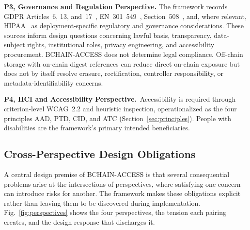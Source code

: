 \documentclass[journal]{IEEEtran}
\begin{document}
\noindent\textbf{P3, Governance and Regulation Perspective.}
The framework records GDPR Articles~6, 13, and~17~\cite{gdpr2016}, EN~301~549~\cite{en301549}, Section~508~\cite{section508}, and, where relevant, HIPAA~\cite{hipaa1996} as deployment-specific regulatory and governance considerations. These sources inform design questions concerning lawful basis, transparency, data-subject rights, institutional roles, privacy engineering, and accessibility procurement. BCHAIN-ACCESS does not determine legal compliance. Off-chain storage with on-chain digest references can reduce direct on-chain exposure but does not by itself resolve erasure, rectification, controller responsibility, or metadata-identifiability concerns.

\noindent\textbf{P4, HCI and Accessibility Perspective.}\ Accessibility is required
through criterion-level WCAG~2.2 and heuristic inspection, operationalized as
the four principles AAD, PTD, CID, and ATC (Section~\ref{sec:principles}). People with
disabilities are the framework's primary intended beneficiaries.

\subsection{Cross-Perspective Design Obligations}

A central design premise of BCHAIN-ACCESS is that several consequential problems arise at the intersections of perspectives, where satisfying one concern can introduce risks for another. The framework makes these obligations explicit rather than leaving them to be discovered during implementation. Fig.~\ref{fig:perspectives} shows the four perspectives, the tension each pairing creates, and the design response that discharges it.
\end{document}
